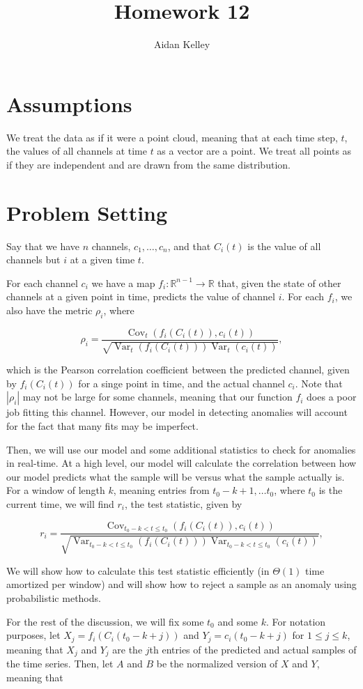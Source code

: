\documentclass{article}
\title{Homework 12}
\author{Aidan Kelley}
\newcommand{\bR}{\mathbb{R}}
\DeclareMathOperator{\Cov}{\mathrm{Cov}}
\DeclareMathOperator{\Var}{\mathrm{Var}}
\begin{document}
\section{Assumptions}

We treat the data as if it were a point cloud, meaning that at each time step, $t$, the values of all channels at time $t$ as a vector are a point. We treat all points as if they are independent and are drawn from the same distribution.

\section{Problem Setting}

Say that we have $n$ channels, $c_1, \ldots, c_n$, and that $C_i(t)$ is the value of all channels but $i$ at a given time $t$.

For each channel $c_i$ we have a map $f_i: \bR^{n - 1} \to \bR$ that, given the state of other channels at a given point in time, predicts the value of channel $i$. For each $f_i$, we also have the metric $\rho_i$, where

$$\rho_i = \frac{\Cov_t(f_i(C_i(t)), c_i(t))}{\sqrt{\Var_t(f_i(C_i(t)))\Var_t(c_i(t))}},$$

which is the Pearson correlation coefficient between the predicted channel, given by $f_i(C_i(t))$ for a singe point in time, and the actual channel $c_i$. Note that $|\rho_i|$ may not be large for some channels, meaning that our function $f_i$ does a poor job fitting this channel. However, our model in detecting anomalies will account for the fact that many fits may be imperfect.

Then, we will use our model and some additional statistics to check for anomalies in real-time. At a high level, our model will calculate the correlation between how our model predicts what the sample will be versus what the sample actually is. For a window of length $k$, meaning entries from $t_0-k+1, \ldots t_0$, where $t_0$ is the current time, we will find $r_i$, the test statistic, given by

$$r_i = \frac{\Cov_{t_0 - k < t \le t_0}(f_i(C_i(t)), c_i(t))}{\sqrt{\Var_{t_0 - k < t \le t_0}(f_i(C_i(t)))\Var_{t_0 - k < t \le t_0}(c_i(t))}},$$

We will show how to calculate this test statistic efficiently (in $\Theta(1)$ time amortized per window) and will show how to reject a sample as an anomaly using probabilistic methods.

For the rest of the discussion, we will fix some $t_0$ and some $k$. For notation purposes, let $X_j = f_i(C_i(t_0 - k + j))$ and $Y_j = c_i(t_0 - k + j)$ for $1 \le j \le k$, meaning that $X_j$ and $Y_j$ are the $j$th entries of the predicted and actual samples of the time series. Then, let $A$ and $B$ be the normalized version of $X$ and $Y$, meaning that
\end{document}
